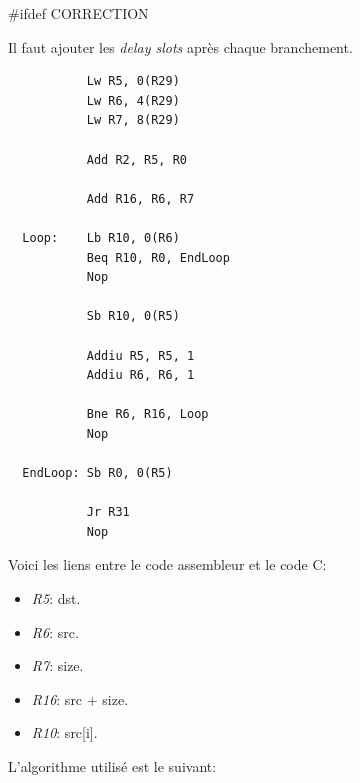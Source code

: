 #ifdef CORRECTION
\begin{correction}

  Il faut ajouter les \textit{delay slots} apr\`es chaque branchement.

  \begin{verbatim}
           Lw R5, 0(R29)
           Lw R6, 4(R29)
           Lw R7, 8(R29)

           Add R2, R5, R0

           Add R16, R6, R7

  Loop:    Lb R10, 0(R6)
           Beq R10, R0, EndLoop
           Nop

           Sb R10, 0(R5)

           Addiu R5, R5, 1
           Addiu R6, R6, 1

           Bne R6, R16, Loop
           Nop

  EndLoop: Sb R0, 0(R5)

           Jr R31
           Nop
  \end{verbatim}

  Voici les liens entre le code assembleur et le code C:

  \begin{itemize}
    \item
      \textit{R5}: dst.
    \item
      \textit{R6}: src.
    \item
      \textit{R7}: size.
    \item
      \textit{R16}: src + size.
    \item
      \textit{R10}: src[i].
  \end{itemize}

  L'algorithme utilis\'e est le suivant:


\end{correction}
